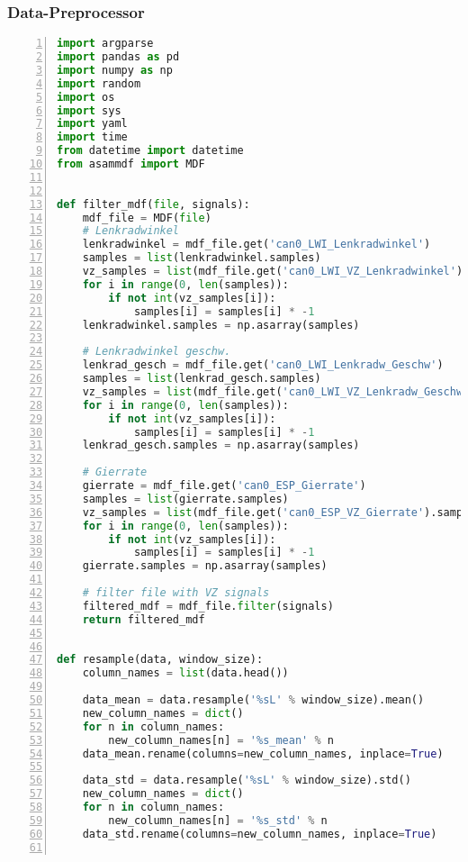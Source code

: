 \subsubsection{Data-Preprocessor}

\begin{lstlisting}[frame=lines, caption=Ausschnitt Fahreridentifikation, captionpos=b, label = lst:a_sw_dp, numbers=left, language=Python, showstringspaces=false, basicstyle=\footnotesize]
import argparse
import pandas as pd
import numpy as np
import random
import os
import sys
import yaml
import time
from datetime import datetime
from asammdf import MDF


def filter_mdf(file, signals):
    mdf_file = MDF(file)
    # Lenkradwinkel
    lenkradwinkel = mdf_file.get('can0_LWI_Lenkradwinkel')
    samples = list(lenkradwinkel.samples)
    vz_samples = list(mdf_file.get('can0_LWI_VZ_Lenkradwinkel').samples)
    for i in range(0, len(samples)):
        if not int(vz_samples[i]):
            samples[i] = samples[i] * -1
    lenkradwinkel.samples = np.asarray(samples)

    # Lenkradwinkel geschw.
    lenkrad_gesch = mdf_file.get('can0_LWI_Lenkradw_Geschw')
    samples = list(lenkrad_gesch.samples)
    vz_samples = list(mdf_file.get('can0_LWI_VZ_Lenkradw_Geschw').samples)
    for i in range(0, len(samples)):
        if not int(vz_samples[i]):
            samples[i] = samples[i] * -1
    lenkrad_gesch.samples = np.asarray(samples)

    # Gierrate
    gierrate = mdf_file.get('can0_ESP_Gierrate')
    samples = list(gierrate.samples)
    vz_samples = list(mdf_file.get('can0_ESP_VZ_Gierrate').samples)
    for i in range(0, len(samples)):
        if not int(vz_samples[i]):
            samples[i] = samples[i] * -1
    gierrate.samples = np.asarray(samples)

    # filter file with VZ signals
    filtered_mdf = mdf_file.filter(signals)
    return filtered_mdf


def resample(data, window_size):
    column_names = list(data.head())

    data_mean = data.resample('%sL' % window_size).mean()
    new_column_names = dict()
    for n in column_names:
        new_column_names[n] = '%s_mean' % n
    data_mean.rename(columns=new_column_names, inplace=True)

    data_std = data.resample('%sL' % window_size).std()
    new_column_names = dict()
    for n in column_names:
        new_column_names[n] = '%s_std' % n
    data_std.rename(columns=new_column_names, inplace=True)


\end{lstlisting}
